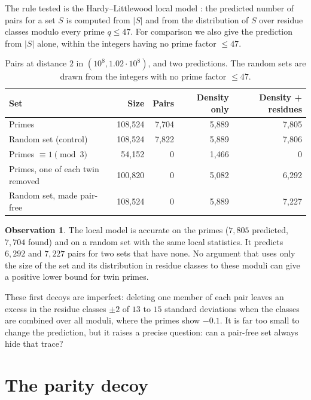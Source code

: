 \documentclass[11pt]{article}
\theoremstyle{definition}
\newtheorem{observation}[theorem]{Observation}
\theoremstyle{remark}
\begin{document}
The rule tested is the Hardy--Littlewood local model \cite{hl}: the predicted
number of pairs for a set $S$ is computed from $|S|$ and from the distribution
of $S$ over residue classes modulo every prime $q\le47$. For comparison we also
give the prediction from $|S|$ alone, within the integers having no prime factor
$\le 47$.

\begin{table}[h]
\centering
\begin{tabular}{lrrrr}
\toprule
Set & Size & Pairs & Density only & Density + residues \\
\midrule
Primes & 108{,}524 & 7{,}704 & 5{,}889 & 7{,}805 \\
Random set (control) & 108{,}524 & 7{,}822 & 5{,}889 & 7{,}806 \\
Primes $\equiv1 \pmod 3$ & 54{,}152 & 0 & 1{,}466 & 0 \\
Primes, one of each twin removed & 100{,}820 & 0 & 5{,}082 & 6{,}292 \\
Random set, made pair-free & 108{,}524 & 0 & 5{,}889 & 7{,}227 \\
\bottomrule
\end{tabular}
\caption{Pairs at distance $2$ in $(10^8,1.02\cdot10^8)$, and two predictions.
The random sets are drawn from the integers with no prime factor $\le47$.}
\label{tab:decoy}
\end{table}

\begin{observation}
The local model is accurate on the primes ($7{,}805$ predicted, $7{,}704$
found) and on a random set with the same local statistics. It predicts
$6{,}292$ and $7{,}227$ pairs for two sets that have none. No argument that uses
only the size of the set and its distribution in residue classes to these
moduli can give a positive lower bound for twin primes.
\end{observation}

These first decoys are imperfect: deleting one member of each pair leaves an
excess in the residue classes $\pm2$ of $13$ to $15$ standard deviations when the
classes are combined over all moduli, where the primes show $-0.1$. It is far too
small to change the prediction, but it raises a precise question: can a
pair-free set always hide that trace?

\section{The parity decoy}\label{sec:parity}
\end{document}
